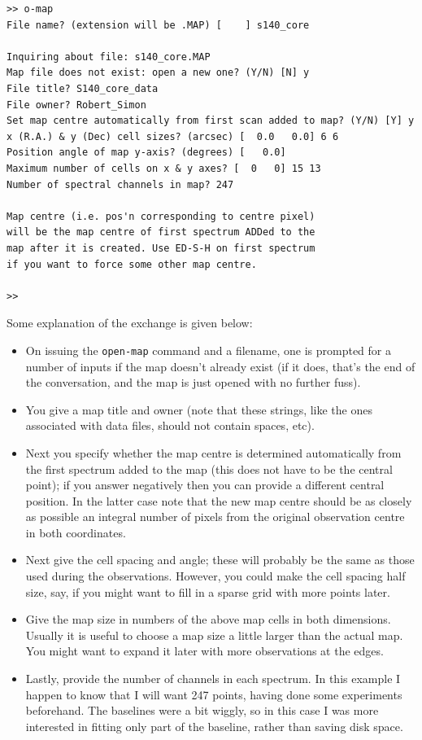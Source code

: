 \documentclass[11pt,twoside]{article}
\begin{document}
\begin{verbatim}
>> o-map
File name? (extension will be .MAP) [    ] s140_core

Inquiring about file: s140_core.MAP
Map file does not exist: open a new one? (Y/N) [N] y
File title? S140_core_data
File owner? Robert_Simon
Set map centre automatically from first scan added to map? (Y/N) [Y] y
x (R.A.) & y (Dec) cell sizes? (arcsec) [  0.0   0.0] 6 6
Position angle of map y-axis? (degrees) [   0.0]
Maximum number of cells on x & y axes? [  0   0] 15 13
Number of spectral channels in map? 247

Map centre (i.e. pos'n corresponding to centre pixel)
will be the map centre of first spectrum ADDed to the
map after it is created. Use ED-S-H on first spectrum
if you want to force some other map centre.

>>
\end{verbatim}

Some explanation of the exchange is given below:
\begin{itemize}
\item
On issuing the {\tt open-map} command and a filename, one is prompted
for a number of inputs if the map doesn't already exist (if it does,
that's the end of the conversation, and the map is just opened with no
further fuss).
\item
You give a map title and owner (note that these strings, like the ones
associated with data files, should not contain spaces, etc).
\item
Next you specify whether the map centre is determined automatically
from the first spectrum added to the map (this does not have to be the
central point); if you answer negatively then you can provide a
different central position. In the latter case note that the new map
centre should be as closely as possible an integral number of pixels
from the original observation centre in both coordinates.
\item
Next give the cell spacing and angle; these will probably be the same
as those used during the observations. However, you could make the
cell spacing half size, say, if you might want to fill in a sparse
grid with more points later.
\item
Give the map size in numbers of the above map cells in both
dimensions. Usually it is useful to choose a map size a little larger
than the actual map. You might want to expand it later with more
observations at the edges.
\item
Lastly, provide the number of channels in each spectrum. In this
example I happen to know that I will want 247 points, having done
some experiments beforehand. The baselines were a bit wiggly, so in
this case I was more interested in fitting only part of the baseline,
rather than saving disk space.
\end{itemize}
\end{document}
